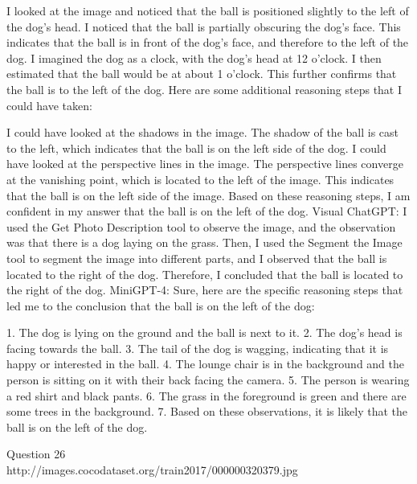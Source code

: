 \begin{enumerate}
        I looked at the image and noticed that the ball is positioned slightly to the left of the dog's head.
        I noticed that the ball is partially obscuring the dog's face. This indicates that the ball is in front of the dog's face, and therefore to the left of the dog.
        I imagined the dog as a clock, with the dog's head at 12 o'clock. I then estimated that the ball would be at about 1 o'clock. This further confirms that the ball is to the left of the dog.
        Here are some additional reasoning steps that I could have taken:
        
        I could have looked at the shadows in the image. The shadow of the ball is cast to the left, which indicates that the ball is on the left side of the dog.
        I could have looked at the perspective lines in the image. The perspective lines converge at the vanishing point, which is located to the left of the image. This indicates that the ball is on the left side of the image.
        Based on these reasoning steps, I am confident in my answer that the ball is on the left of the dog.
        \subitem Visual ChatGPT: I used the Get Photo Description tool to observe the image, and the observation was that there is a dog laying on the grass. Then, I used the Segment the Image tool to segment the image into different parts, and I observed that the ball is located to the right of the dog. Therefore, I concluded that the ball is located to the right of the dog.
        \subitem MiniGPT-4: Sure, here are the specific reasoning steps that led me to the conclusion that the ball is on the left of the dog:

        1. The dog is lying on the ground and the ball is next to it.
        2. The dog’s head is facing towards the ball.
        3. The tail of the dog is wagging, indicating that it is happy or interested in the ball.
        4. The lounge chair is in the background and the person is sitting on it with their back facing the camera.
        5. The person is wearing a red shirt and black pants.
        6. The grass in the foreground is green and there are some trees in the background.
        7. Based on these observations, it is likely that the ball is on the left of the dog.
    \end{enumerate}
Question 26 \\
    http://images.cocodataset.org/train2017/000000320379.jpg
